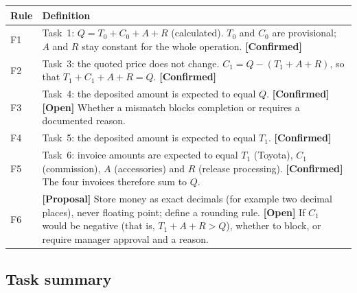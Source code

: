 \documentclass[11pt,a4paper]{article}
\newcommand{\tagconf}{\textcolor{green!45!black}{\textbf{[Confirmed]}}}
\newcommand{\tagprop}{\textcolor{orange!80!black}{\textbf{[Proposal]}}}
\newcommand{\tagopen}{\textcolor{red!70!black}{\textbf{[Open]}}}
\begin{document}
\begin{longtable}{@{}L{1.2cm}L{14.6cm}@{}}
	\toprule
	\textbf{Rule} & \textbf{Definition}                                                                                                                                                                  \\
	\midrule
	\endhead
	F1            & Task~1: $Q = T_0 + C_0 + A + R$ (calculated). $T_0$ and $C_0$ are provisional; $A$ and $R$ stay constant for the whole operation. \tagconf{}                                         \\
	F2            & Task~3: the quoted price does not change. $C_1 = Q - (T_1 + A + R)$, so that $T_1 + C_1 + A + R = Q$. \tagconf{}                                                                     \\
	F3            & Task~4: the deposited amount is expected to equal $Q$. \tagconf{}
	\tagopen{} Whether a mismatch blocks completion or requires a documented
	reason.                                                                                                                                                                                              \\
	F4            & Task~5: the deposited amount is expected to equal $T_1$. \tagconf{}                                                                                                                  \\
	F5            & Task~6: invoice amounts are expected to equal $T_1$ (Toyota), $C_1$ (commission), $A$ (accessories) and $R$ (release processing). \tagconf{} The four invoices therefore sum to $Q$. \\
	F6            & \tagprop{} Store money as exact decimals (for example two decimal places),
	never floating point; define a rounding rule. \tagopen{} If $C_1$ would be
	negative (that is, $T_1 + A + R > Q$), whether to block, or require manager
	approval and a reason.                                                                                                                                                                               \\
	\bottomrule
\end{longtable}

\subsection{Task summary}
\end{document}
